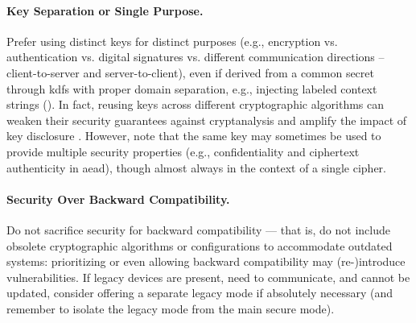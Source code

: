 
\paragraph*{Key Separation or Single Purpose.} Prefer using distinct keys for distinct purposes (e.g., encryption vs. authentication vs. digital signatures vs. different communication directions – client-to-server and server-to-client), even if derived from a common secret through \glspl{kdf} with proper domain separation, e.g., injecting labeled context strings (). In fact, reusing keys across different cryptographic algorithms can weaken their security guarantees against cryptanalysis and amplify the impact of key disclosure \cite{barker_recommendation_2020_p1}. However, note that the same key may sometimes be used to provide multiple security properties (e.g., confidentiality and ciphertext authenticity in \gls{aead}), though almost always in the context of a single cipher.


\paragraph*{Security Over Backward Compatibility.} Do not sacrifice security for backward compatibility --- that is, do not include obsolete cryptographic algorithms or configurations to accommodate outdated systems: prioritizing or even allowing backward compatibility may (re-)introduce vulnerabilities. If legacy devices are present, need to communicate, and cannot be updated, consider offering a separate legacy mode if absolutely necessary (and remember to isolate the legacy mode from the main secure mode).


